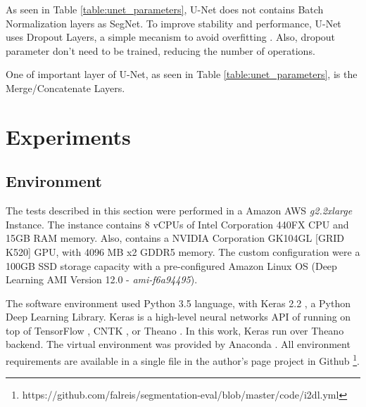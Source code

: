 \documentclass[10pt,twocolumn,letterpaper]{article}
\begin{document}
As seen in Table \ref{table:unet_parameters}, U-Net does not contains Batch Normalization layers as SegNet. To improve stability and performance, U-Net uses Dropout Layers, a simple mecanism to avoid overfitting \cite{DROPOUT}. Also, dropout parameter don't need to be trained, reducing the number of operations.

One of important layer of U-Net, as seen in Table \ref{table:unet_parameters}, is the Merge/Concatenate Layers.

\section{Experiments} \label{sec:experiments}


\subsection{Environment} \label{ssec:environment}

The tests described in this section were performed in a Amazon AWS \cite{AMAZON_WEBSITE} \textit{g2.2xlarge} Instance. The instance contains 8 vCPUs of Intel Corporation 440FX CPU and 15GB RAM memory. Also, contains a NVIDIA Corporation GK104GL [GRID K520] GPU, with 4096 MB x2 GDDR5 memory. The custom configuration were a 100GB SSD storage capacity with a pre-configured Amazon Linux OS (Deep Learning AMI Version 12.0 - \textit{ami-f6a94495}).

The software environment used Python 3.5 \cite{PYTHON_WEBSITE} language, with Keras 2.2 \cite{KERAS}, a Python Deep Learning Library. Keras is a high-level neural networks API of running on top of TensorFlow \cite{TENSORFLOW}, CNTK \cite{CNTK}, or Theano \cite{THEANO} \cite{KERAS}. In this work, Keras run over Theano \cite{THEANO} backend. The virtual environment was provided by Anaconda \cite{ANACONDA_WEBSITE}. All environment requirements are available in a single file in the author's page project in Github \footnote{https://github.com/falreis/segmentation-eval/blob/master/code/i2dl.yml}.
\end{document}
